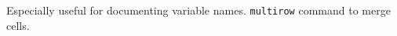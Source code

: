 
Especially useful for 
documenting variable names.
\texttt{multirow} command
to merge cells.



\lipsum[101]


   
\lipsum[101]
 
